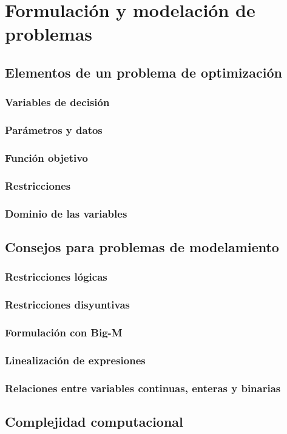 \section{Formulación y modelación de problemas}

\subsection{Elementos de un problema de optimización}
\subsubsection{Variables de decisión}

\subsubsection{Parámetros y datos}

\subsubsection{Función objetivo}

\subsubsection{Restricciones}

\subsubsection{Dominio de las variables}

\subsection{Consejos para problemas de modelamiento}

\subsubsection{Restricciones lógicas}

\subsubsection{Restricciones disyuntivas}

\subsubsection{Formulación con Big-M}

\subsubsection{Linealización de expresiones}

\subsubsection{Relaciones entre variables continuas, enteras y binarias}

\subsection{Complejidad computacional}